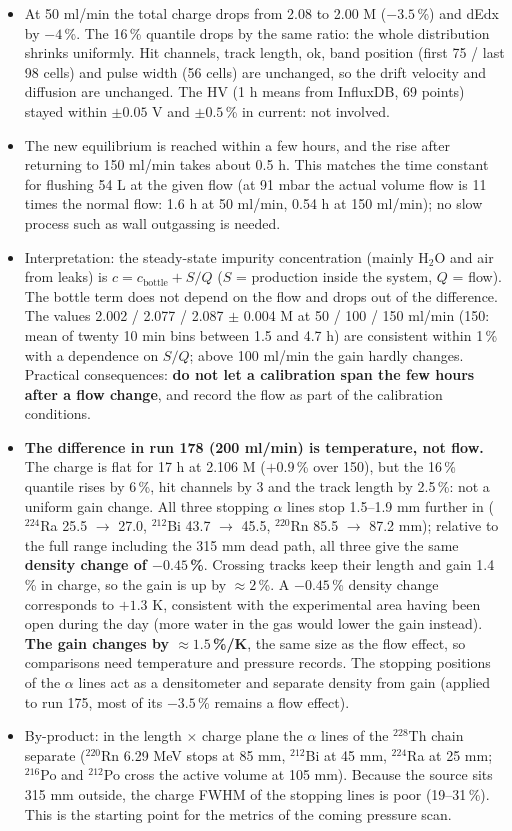 \documentclass[a4paper,11pt]{article}
\begin{document}
\begin{itemize}
\item At 50 ml/min the total charge drops from 2.08 to 2.00 M ($-3.5$\,\%) and dEdx by $-4$\,\%. The 16\,\% quantile drops by the same ratio: the whole distribution shrinks uniformly. Hit channels, track length, ok, band position (first 75 / last 98 cells) and pulse width (56 cells) are unchanged, so the drift velocity and diffusion are unchanged. The HV (1 h means from InfluxDB, 69 points) stayed within $\pm 0.05$ V and $\pm 0.5$\,\% in current: not involved.
\item The new equilibrium is reached within a few hours, and the rise after returning to 150 ml/min takes about 0.5 h. This matches the time constant for flushing 54 L at the given flow (at 91 mbar the actual volume flow is 11 times the normal flow: 1.6 h at 50 ml/min, 0.54 h at 150 ml/min); no slow process such as wall outgassing is needed.
\item Interpretation: the steady-state impurity concentration (mainly H$_2$O and air from leaks) is $c = c_\mathrm{bottle} + S/Q$ ($S$ = production inside the system, $Q$ = flow). The bottle term does not depend on the flow and drops out of the difference. The values 2.002 / 2.077 / 2.087 $\pm$ 0.004 M at 50 / 100 / 150 ml/min (150: mean of twenty 10 min bins between 1.5 and 4.7 h) are consistent within 1\,\% with a dependence on $S/Q$; above 100 ml/min the gain hardly changes. Practical consequences: \textbf{do not let a calibration span the few hours after a flow change}, and record the flow as part of the calibration conditions.
\item \textbf{The difference in run 178 (200 ml/min) is temperature, not flow.} The charge is flat for 17 h at 2.106 M ($+0.9$\,\% over 150), but the 16\,\% quantile rises by 6\,\%, hit channels by 3 and the track length by 2.5\,\%: not a uniform gain change. All three stopping $\alpha$ lines stop 1.5--1.9 mm further in ($^{224}$Ra 25.5 $\to$ 27.0, $^{212}$Bi 43.7 $\to$ 45.5, $^{220}$Rn 85.5 $\to$ 87.2 mm); relative to the full range including the 315 mm dead path, all three give the same \textbf{density change of $-0.45$\,\%}. Crossing tracks keep their length and gain 1.4\,\% in charge, so the gain is up by $\approx 2$\,\%. A $-0.45$\,\% density change corresponds to $+1.3$ K, consistent with the experimental area having been open during the day (more water in the gas would lower the gain instead). \textbf{The gain changes by $\approx 1.5$\,\%/K}, the same size as the flow effect, so comparisons need temperature and pressure records. The stopping positions of the $\alpha$ lines act as a densitometer and separate density from gain (applied to run 175, most of its $-3.5$\,\% remains a flow effect).
\item By-product: in the length $\times$ charge plane the $\alpha$ lines of the $^{228}$Th chain separate ($^{220}$Rn 6.29 MeV stops at 85 mm, $^{212}$Bi at 45 mm, $^{224}$Ra at 25 mm; $^{216}$Po and $^{212}$Po cross the active volume at 105 mm). Because the source sits 315 mm outside, the charge FWHM of the stopping lines is poor (19--31\,\%). This is the starting point for the metrics of the coming pressure scan.
\end{itemize}
\end{document}
